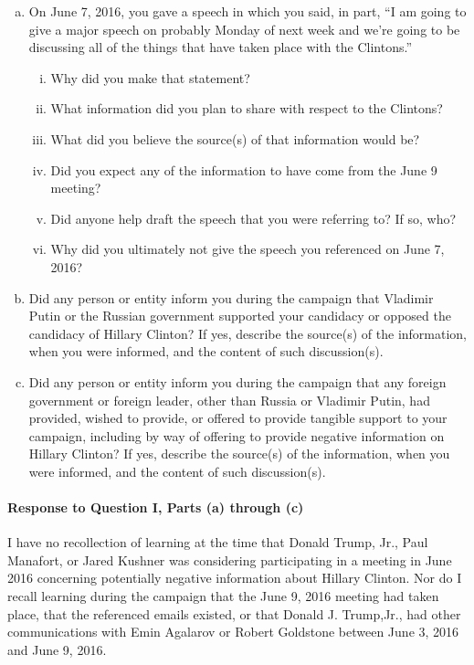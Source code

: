 \begin{enumerate}[a.]
\item On June 7, 2016, you gave a speech in which you said, in part, “I am going to give a major speech on probably Monday of next week and we’re going to be discussing all of the things that have taken place with the Clintons.”

\begin{enumerate}[i.]

\item Why did you make that statement?
\item What information did you plan to share with respect to the Clintons?
\item What did you believe the source(s) of that information would be?
\item Did you expect any of the information to have come from the June 9 meeting?
\item Did anyone help draft the speech that you were referring to? If so, who?
\item Why did you ultimately not give the speech you referenced on June 7, 2016?

\end{enumerate}

\item Did any person or entity inform you during the campaign that Vladimir Putin or the Russian government supported your candidacy or opposed the candidacy of Hillary Clinton?
If yes, describe the source(s) of the information, when you were informed, and the content of such discussion(s).

\item Did any person or entity inform you during the campaign that any foreign government or foreign leader, other than Russia or Vladimir Putin, had provided, wished to provide, or offered to provide tangible support to your campaign, including by way of offering to provide negative information on Hillary Clinton?
If yes, describe the source(s) of the information, when you were informed, and the content of such discussion(s).

\end{enumerate}

\paragraph*{Response to Question I, Parts (a) through (c)}

I have no recollection of learning at the time that Donald Trump, Jr., Paul Manafort, or Jared Kushner was considering participating in a meeting in June 2016 concerning potentially negative information about Hillary Clinton.
Nor do I recall learning during the campaign that the June 9, 2016 meeting had taken place, that the referenced emails existed, or that Donald J. Trump,Jr., had other communications with Emin Agalarov or Robert Goldstone between June 3, 2016 and June 9, 2016.

